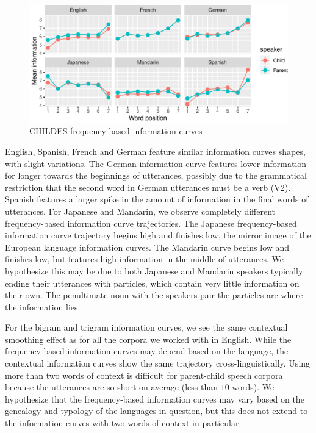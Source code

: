 \documentclass[11pt,]{article}
\begin{document}
\begin{figure}
\centering
\includegraphics{paper_files/figure-latex/unnamed-chunk-1-1.pdf}
\caption{\label{fig:unnamed-chunk-1}CHILDES frequency-based information curves}
\end{figure}

English, Spanish, French and German feature similar information curves shapes, with slight variations. The German information curve features lower information for longer towards the beginnings of utterances, possibly due to the grammatical restriction that the second word in German utterances must be a verb (V2). Spanish features a larger spike in the amount of information in the final words of utterances. For Japanese and Mandarin, we observe completely different frequency-based information curve trajectories. The Japanese frequency-based information curve trajectory begins high and finishes low, the mirror image of the European language information curves. The Mandarin curve begins low and finishes low, but features high information in the middle of utterances. We hypothesize this may be due to both Japanese and Mandarin speakers typically ending their utterances with particles, which contain very little information on their own. The penultimate noun with the speakers pair the particles are where the information lies.

For the bigram and trigram information curves, we see the same contextual smoothing effect as for all the corpora we worked with in English. While the frequency-based information curves may depend based on the language, the contextual information curves show the same trajectory cross-linguistically. Using more than two words of context is difficult for parent-child speech corpora because the utterances are so short on average (less than \(10\) words). We hypothesize that the frequency-based information curves may vary based on the genealogy and typology of the languages in question, but this does not extend to the information curves with two words of context in particular.
\end{document}
